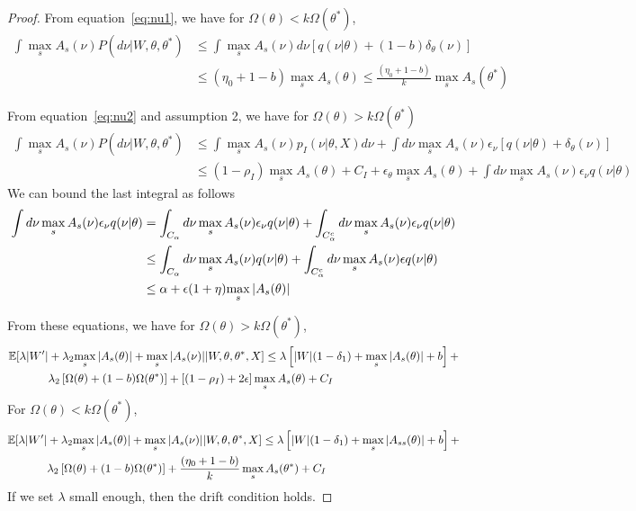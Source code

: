 \begin{proof}
From equation~\eqref{eq:nu1}, we have for 
$\Omega(\theta) < k\Omega(\theta^*)$,
\begin{align*}
\int \max_sA_s(\nu)P(d\nu| W, \theta, \theta^*)  
  &\leq \int \max_sA_s(\nu) d\nu \left[q(\nu | \theta) + 
    \left(1 - b \right)\delta_\theta(\nu)\right] \\
    &\leq (\eta_0 + 1 - b) \max_sA_s(\theta) 
    \leq \frac{(\eta_0 + 1 - b)}{k} \max_sA_s(\theta^*) 
\end{align*}

From equation~\eqref{eq:nu2} and assumption 2, we have for 
$\Omega(\theta) > k\Omega(\theta^*)$
\begin{align*}
\int \max_sA_s(\nu)P(d\nu| W, \theta, \theta^*)  &\leq 
\int \max_sA_s(\nu) p_I(\nu|\theta,X) d\nu +\int d\nu\max_s A_s(\nu)  \epsilon_\nu[q(\nu|\theta)+\delta_\theta(\nu)] \\ 
&\leq (1-\rho_I) \max_sA_s(\theta)  + C_I  + \epsilon_\theta \max_sA_s(\theta)
 +\int d\nu\max_s A_s(\nu)  \epsilon_\nu q(\nu|\theta) 
\end{align*}
We can bound the last integral as follows
\begin{align*}
  \int d\nu\max_s A_s(\nu)  \epsilon_\nu q(\nu|\theta) &=  
  \int_{C_\alpha} d\nu\max_s A_s(\nu)  \epsilon_\nu q(\nu|\theta) +  
  \int_{C_\alpha^c} d\nu\max_s A_s(\nu)  \epsilon_\nu q(\nu|\theta) \\
  &\le \int_{C_\alpha} d\nu\max_s A_s(\nu)  q(\nu|\theta) +  
  \int_{C_\alpha^c} d\nu\max_s A_s(\nu)  \epsilon q(\nu|\theta) \\
  &\le \alpha + \epsilon (1+\eta) {\max_s |A_s(\theta)|}
\end{align*}

From these equations, we have for $\Omega(\theta) > k \Omega(\theta^*)$,
\begin{align*}
  \mathbb{E}[\lambda |W'| &+ \lambda_2 {\max_s |A_s(\theta)|} + {\max_s |A_s(\nu)|}| 
  W, \theta, \theta^*, X] \leq 
  \lambda \left[|W|(1 - \delta_1) +  {\max_s |A_s(\theta)|} + b\right] + \\
  & \lambda_2\left[ \Omega(\theta) + (1-b)\Omega(\theta^*)\right] +
  \left[(1-\rho_I)  +2 \epsilon \right] \max_sA_s(\theta) + C_I 
\end{align*}
For $\Omega(\theta) < k \Omega(\theta^*)$,
\begin{align*}
  \mathbb{E}[\lambda |W'| &+ \lambda_2 {\max_s |A_s(\theta)|} + {\max_s |A_s(\nu)|}| W, \theta, \theta^*, X] \leq 
  \lambda \left[|W|(1 - \delta_1) +  \max_s|A_{ss}(\theta)| + b\right] + \\
  & \lambda_2\left[ \Omega(\theta) + (1-b)\Omega(\theta^*)\right] +
    \frac{(\eta_0 + 1 - b)}{k} \max_sA_s(\theta^*) + C_I 
\end{align*}
If we set  $\lambda$ small enough, then the drift condition holds.
\end{proof}
